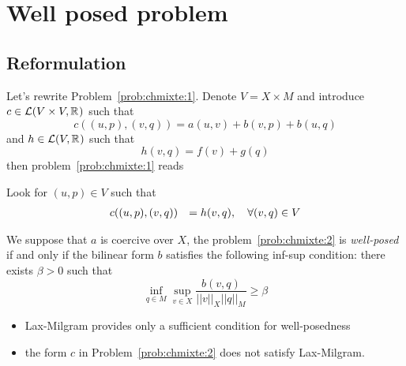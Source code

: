 \section{Well posed problem}
\label{sec:well-posed-problemframe}


\subsection{Reformulation}
  Let's rewrite Problem~\ref{prob:chmixte:1}. Denote $V=X\times M$ and introduce $c
  \in \mathcal{L}(V\times V, \mathbb R^{})$ such that
  \begin{equation}
    \label{eq:chmixte:5}
    c((u,p),(v,q)) = a(u,v)+b(v,p)+b(u,q)
  \end{equation}
  and $h\in \mathcal{L}(V,\mathbb R^{})$ such that
  \begin{equation}
    \label{eq:chmixte:6}
    h(v,q) = f(v)+g(q)
  \end{equation}
  then problem~\ref{prob:chmixte:1} reads
  \begin{problem}
    \label{prob:chmixte:2}
    Look for $(u,p) \in V$ such that
    \begin{equation}
      \label{eq:chmixte:7}
        \begin{array}[c]{rl}
          c((u,p), (v,q)) & = h(v,q), \quad \forall (v,q) \in V
        \end{array}
      \end{equation}
  \end{problem}


  \begin{theorem}
    \label{thr:chmixte:1}
    We suppose that $a$ is coercive over $X$, the problem~\ref{prob:chmixte:2} is
    \emph{well-posed} if and only if the bilinear form $b$ satisfies the
    following inf-sup condition: there exists $\beta > 0$ such that
    \begin{equation}
      \label{eq:chmixte:8}
      \inf_{q \in M} \sup_{v \in X} \frac{b(v,q)}{||v||_X ||q||_M} \geq \beta
    \end{equation}
  \end{theorem}
  \begin{remark}
    \begin{itemize}
    \item Lax-Milgram provides only a sufficient condition for well-posedness
    \item the form $c$ in Problem~\ref{prob:chmixte:2} does not satisfy Lax-Milgram.
    \end{itemize}
  \end{remark}


